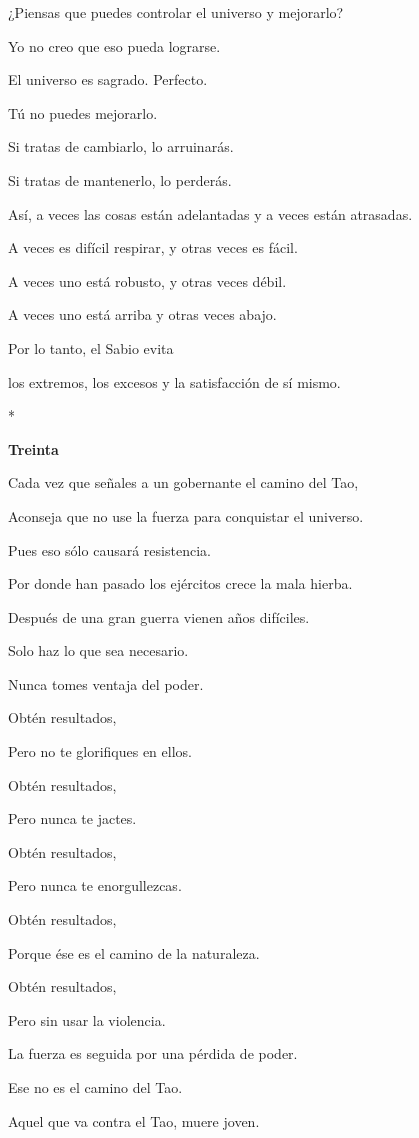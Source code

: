 ¿Piensas que puedes controlar el universo y mejorarlo?

Yo no creo que eso pueda lograrse.

El universo es sagrado. Perfecto.

Tú no puedes mejorarlo.

Si tratas de cambiarlo, lo arruinarás.

Si tratas de mantenerlo, lo perderás.

Así, a veces las cosas están adelantadas y a veces están atrasadas.

A veces es difícil respirar, y otras veces es fácil.

A veces uno está robusto, y otras veces débil.

A veces uno está arriba y otras veces abajo.

Por lo tanto, el Sabio evita

los extremos, los excesos y la satisfacción de sí mismo.

*

\textbf{Treinta}

Cada vez que señales a un gobernante el camino del Tao,

Aconseja que no use la fuerza para conquistar el universo.

Pues eso sólo causará resistencia.

Por donde han pasado los ejércitos crece la mala hierba.

Después de una gran guerra vienen años difíciles.

Solo haz lo que sea necesario.

Nunca tomes ventaja del poder.

Obtén resultados,

Pero no te glorifiques en ellos.

Obtén resultados,

Pero nunca te jactes.

Obtén resultados,

Pero nunca te enorgullezcas.

Obtén resultados,

Porque ése es el camino de la naturaleza.

Obtén resultados,

Pero sin usar la violencia.

La fuerza es seguida por una pérdida de poder.

Ese no es el camino del Tao.

Aquel que va contra el Tao, muere joven.

